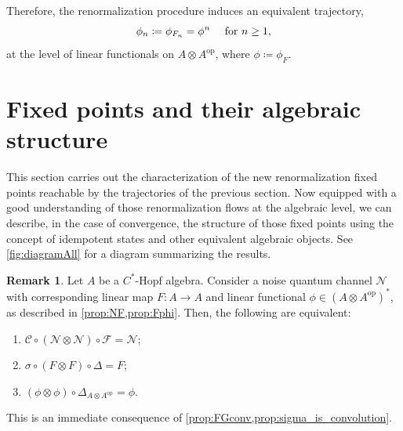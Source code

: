 \documentclass[a4paper,10pt]{amsart}
\newcommand{\Fine}{\mathcal{F}}
\newcommand{\Coarse}{\mathcal{C}}
\newcommand{\Noisy}{\mathcal{N}}
\theoremstyle{definition}
\newtheorem{remark}[theorem]{Remark}
\begin{document}
Therefore, the renormalization procedure induces an equivalent trajectory,
\begin{equation}
\phi_{n} \coloneqq \phi_{\smash{F_{n}}} = \phi^n \quad\text{ for }n\geq 1,
\end{equation}
at the level of linear functionals on $A\otimes A^{\mathrm{op}}$, where $\phi \coloneqq \phi_{F}$.

\section{Fixed points and their algebraic structure}
\label{sec:fixedpoints}

This section carries out the characterization of the new renormalization fixed points reachable by the trajectories of the previous section. Now equipped with a good understanding of those renormalization flows at the algebraic level, we can describe, in the case of convergence, the structure of those fixed points using the concept of idempotent states and other equivalent algebraic objects. See \cref{fig:diagramAll} for a diagram summarizing the results.

\begin{remark}\label{rem:fixedNFphi}
Let $A$ be a $C^*$-Hopf algebra. Consider a noise quantum channel $\Noisy$ with corresponding linear map $F:A\to A$ and linear functional $\phi\in (A\otimes A^{\mathrm{op}})^*$, as described in \cref{prop:NF,prop:Fphi}.
Then, the following are equivalent:
    \begin{enumerate}
        \item[(i)] $\Coarse \circ (\Noisy\otimes \Noisy) \circ \Fine = \Noisy$;
        \item[(ii)] $\sigma \circ (F\otimes F) \circ \Delta = F$;
        \item[(iii)] $(\phi\otimes \phi)\circ \Delta_{A\otimes A^{\mathrm{op}}} = \phi$.
    \end{enumerate}
This is an immediate consequence of \cref{prop:FGconv,prop:sigma_is_convolution}.
\end{remark}
\end{document}

